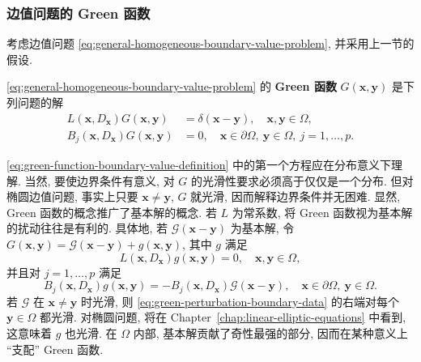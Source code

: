 \subsubsection{边值问题的 Green 函数}\label{subsec:green-functions-boundary-problems}

考虑边值问题 \eqref{eq:general-homogeneous-boundary-value-problem}, 并采用上一节的假设.

\begin{Definition}
\label{def:green-function-boundary-problem}
\eqref{eq:general-homogeneous-boundary-value-problem} 的 \textbf{Green 函数} $G(\bm{x},\bm{y})$ 是下列问题的解
\begin{equation}\label{eq:green-function-boundary-value-definition}
\begin{aligned}
L(\bm{x},D_{\bm{x}})G(\bm{x},\bm{y})&=\delta(\bm{x}-\bm{y}),\quad\bm{x},\bm{y}\in\Omega,\\
B_j(\bm{x},D_{\bm{x}})G(\bm{x},\bm{y})&=0,\quad\bm{x}\in\partial\Omega,\ \bm{y}\in\Omega,\ j=1,\ldots,p.
\end{aligned}
\end{equation}

\end{Definition}

\eqref{eq:green-function-boundary-value-definition} 中的第一个方程应在分布意义下理解. 当然, 要使边界条件有意义, 对 $G$ 的光滑性要求必须高于仅仅是一个分布. 但对椭圆边值问题, 事实上只要 $\bm{x}\ne\bm{y}$, $G$ 就光滑, 因而解释边界条件并无困难. 显然, Green 函数的概念推广了基本解的概念. 若 $L$ 为常系数, 将 Green 函数视为基本解的扰动往往是有利的. 具体地, 若 $\mathcal{G}(\bm{x}-\bm{y})$ 为基本解, 令 $G(\bm{x},\bm{y})=\mathcal{G}(\bm{x}-\bm{y})+g(\bm{x},\bm{y})$, 其中 $g$ 满足
\begin{equation}\label{eq:green-fundamental-solution-smooth-perturbation}
L(\bm{x},D_{\bm{x}})g(\bm{x},\bm{y})=0,\quad\bm{x},\bm{y}\in\Omega,
\end{equation}
并且对 $j=1,\ldots,p$ 满足
\begin{equation}\label{eq:green-perturbation-boundary-data}
B_j(\bm{x},D_{\bm{x}})g(\bm{x},\bm{y})=-B_j(\bm{x},D_{\bm{x}})\mathcal{G}(\bm{x}-\bm{y}),\quad\bm{x}\in\partial\Omega,\ \bm{y}\in\Omega.
\end{equation}
若 $\mathcal{G}$ 在 $\bm{x}\ne\bm{y}$ 时光滑, 则 \eqref{eq:green-perturbation-boundary-data} 的右端对每个 $\bm{y}\in\Omega$ 都光滑. 对椭圆问题, 将在 Chapter~\ref{chap:linear-elliptic-equations} 中看到, 这意味着 $g$ 也光滑. 在 $\Omega$ 内部, 基本解贡献了奇性最强的部分, 因而在某种意义上 ``支配'' Green 函数.

